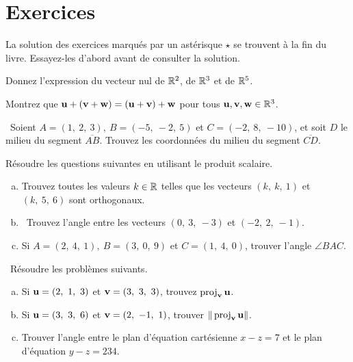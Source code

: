    
\section*{Exercices}

La solution des exercices marqués par un astérisque $\star$ se trouvent à la fin du livre. Essayez-les d'abord avant de consulter la solution.


\begin{prob}
\label{prob02.1}
Donnez l'expression du vecteur nul de $\mathbb{R}^2$, de $\mathbb{R}^3$ et de $\mathbb{R}^5$.
\end{prob}

\begin{prob}
\label{prob02.2}
Montrez que $\mathbf{u} + (\mathbf{v} + \mathbf{w}) = (\mathbf{u} + \mathbf{v}) + \mathbf{w}$ pour tous $\mathbf{u},\mathbf{v},\mathbf{w}\in\mathbb{R}^3$.
\end{prob}
 

\begin{prob}
\label{prob02.3}\sov~Soient $A=(1,\ 2,\ 3),\ B=(-5,\ -2,\ 5)$ et $C=(-2,\ 8,\ -10)$,
et soit $D$ le milieu du segment $\overline{AB}$. Trouvez les coordonnées
du milieu du segment $\overline{CD}$.

\end{prob}
\begin{prob}
\label{prob02.4} Résoudre les questions suivantes en utilisant le produit scalaire.\medskip
\begin{enumerate} [a)]
\item Trouvez toutes les valeurs $k\in\mathbb{R}$ telles que les vecteurs $(k,\ k,\ 1)$ et $(k,\ 5,\ 6)$ sont orthogonaux.\medskip %
\item\sov ~Trouvez l'angle entre les vecteurs $ (0,\ 3,\ -3)$ et $ (-2,\ 2,\ -1)$.\medskip %
\item Si $A=(2,\ 4,\ 1),\ B=(3,\ 0,\ 9)$ et $C=(1,\ 4,\ 0)$, trouver l'angle $ \angle BAC$.  \medskip

\end{enumerate}

\end{prob}

\begin{prob}
\label{prob02.5}\sov~Résoudre les problèmes suivants. \medskip
\begin{enumerate}[a)]

\item Si $\mathbf{u}=(2,\ 1,\ 3)$ et $\mathbf{v}=(3,\ 3,\ 3)$, trouvez
 $\operatorname{proj}_{\mathbf{v}}{\mathbf{u}}$.  \medskip
\item Si $\mathbf{u}=(3,\ 3,\ 6)$ et $\mathbf{v}=(2,\ -1,\ 1)$, trouver
$\|\operatorname{proj}_{\mathbf{v}}{\mathbf{u}}\|$. \medskip
\item Trouver l'angle entre le plan d'équation cartésienne $x-z=7$ et le plan d'équation $y-z=234$.
\medskip

\end{enumerate}

\end{prob}



 

 
 